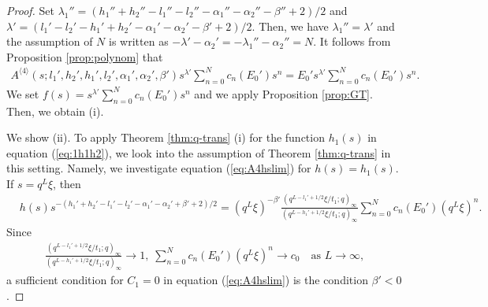 \documentclass[12pt]{amsart}
\numberwithin{equation}{section}
\theoremstyle{definition}
\theoremstyle{remark}
\begin{document}
\begin{proof}
Set $\lambda_{1}'' = (h_{1}'' + h_{2}'' - l_{1}'' - l_{2}'' - \alpha_{1}'' - \alpha_{2}'' - \beta'' + 2)/2$ and $\lambda ' = (l_{1}'  - l_{2}' - h_{1}' + h_{2}' - \alpha_{1}' - \alpha_{2}' - \beta' + 2)/2$.
Then, we have $\lambda_{1}'' = \lambda ' $ and the assumption of $N$ is written as $-\lambda ' - \alpha_{2}' = - \lambda_{1}''  - \alpha_{2}'' =N$.
It follows from Proposition \ref{prop:polynom} that
  \begin{align*}
  A^{\langle 4 \rangle} (s; l_{1}', h_{2}', h_{1}', l_{2}', \alpha_{1}', \alpha_{2}', \beta') s^{\lambda '} \sum_{n = 0}^{N} c_{n}(E_{0}')s^{n} = E_{0}' s^{\lambda '} \sum_{n = 0}^{N} c_{n} (E_{0}') s^{n} .
  \end{align*}
We set $ f(s) = s^{\lambda '} \sum_{n = 0}^{N} c_{n}(E_{0}')s^{n}$ and we apply Proposition \ref{prop:GT}.
Then, we obtain (i).

We show (ii).
To apply Theorem \ref{thm:q-trans} (i) for the function $h_1(s)$ in equation (\ref{eq:1h1h2}), we look into the assumption of Theorem \ref{thm:q-trans} in this setting.
Namely, we investigate equation (\ref{eq:A4hslim}) for $h(s)=h_1(s)$.
If $s= q^{L}\xi$, then
  \begin{align*}
    &h(s) s^{-(h_{1}' + h_{2}' - l_{1}' - l_{2}' - \alpha_{1}' - \alpha_{2}' + \beta' + 2)/2} = (q^{L}\xi)^{-\beta'} \frac{(q^{L - l_{1}' + 1/2}\xi/t_{1}; q)_{\infty}}{(q^{L - h_{1}' + 1/2}\xi/t_{1}; q)_{\infty}} \sum_{n = 0}^{N} c_{n}(E_{0}')  (q^{L}\xi)^{n} .
  \end{align*}
Since
  \begin{align*}
 \frac{(q^{L - l_{1}' + 1/2}\xi/t_{1}; q)_{\infty}}{(q^{L - h_{1}' + 1/2}\xi/t_{1}; q)_{\infty}} \to 1, \; \sum_{n = 0}^{N} c_{n} (E_{0}')  (q^{L}\xi)^{n} \to c_{0} \quad \mbox{as } L \to \infty,
  \end{align*}
a sufficient condition for $C_1=0$ in equation (\ref{eq:A4hslim}) is the condition $\beta' < 0 $.


\end{proof}
\end{document}
